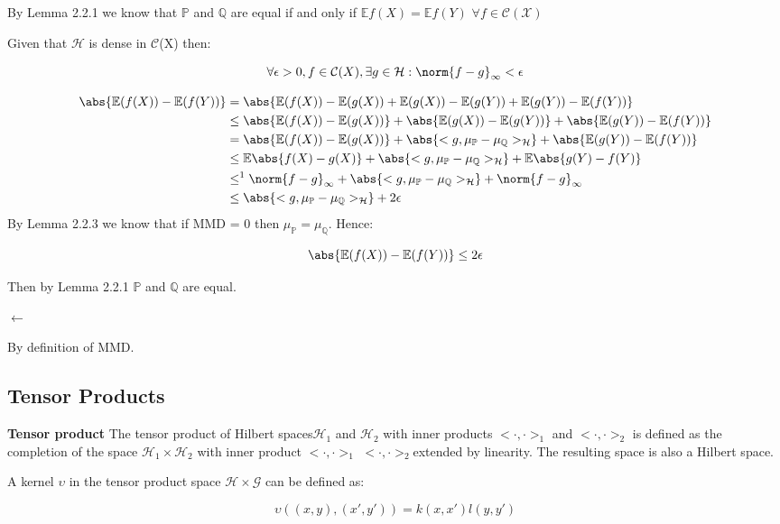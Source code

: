 By Lemma 2.2.1 we know that $\mathbb{P}$ and $\mathbb{Q}$  are equal if and only if $\mathbb{E}f(X) = \mathbb{E}f(Y)$  $\forall f \in \mathcal{C(X)}$

Given that $\mathcal{H}$ is dense in $\mathcal{C}$(X) then:

$$\forall \epsilon >0, f\in\mathcal{C}(X), \exists g\in \mathcal{H} : \norm{f-g}_{\infty} < \epsilon$$

\begin{equation}{}
\begin{split}
\abs{\mathbb{E}(f(X)) - \mathbb{E}(f(Y))}  
& = \abs{\mathbb{E}(f(X)) - \mathbb{E}(g(X)) + \mathbb{E}(g(X)) - \mathbb{E}(g(Y)) +\mathbb{E}(g(Y)) - \mathbb{E}(f(Y))} \\
&\leq \abs{\mathbb{E}(f(X)) - \mathbb{E}(g(X))} + \abs{\mathbb{E}(g(X)) - \mathbb{E}(g(Y))} +\abs{\mathbb{E}(g(Y)) - \mathbb{E}(f(Y))}\\
&= \abs{\mathbb{E}(f(X)) - \mathbb{E}(g(X))} + \abs{<g,\mu_{\mathbb{P}}-\mu_{\mathbb{Q}}>_{\mathcal{H}} } +\abs{\mathbb{E}(g(Y)) - \mathbb{E}(f(Y))} \\
&\leq \mathbb{E}\abs{f(X) - g(X)} + \abs{<g,\mu_{\mathbb{P}}-\mu_{\mathbb{Q}}>_{\mathcal{H}} } +\mathbb{E}\abs{g(Y) - f(Y)} \\ 
&\leq^{1} \norm{f-g}_{\infty}  + \abs{<g,\mu_{\mathbb{P}}-\mu_{\mathbb{Q}}>_{\mathcal{H}} } + \norm{f-g}_{\infty}\\
&\leq \abs{<g,\mu_{\mathbb{P}}-\mu_{\mathbb{Q}}>_{\mathcal{H}} } + 2\epsilon
\end{split}
\end{equation}
By Lemma 2.2.3 we know that if MMD = 0 then $\mu_{\mathbb{P}} = \mu_{\mathbb{Q}}$. Hence:

$$\abs{\mathbb{E}(f(X)) - \mathbb{E}(f(Y))} \leq 2\epsilon$$

Then by Lemma 2.2.1 $\mathbb{P}$ and $\mathbb{Q}$  are equal.

\begin{flushleft}
$\leftarrow$
\end{flushleft}
By definition of MMD.

\newpage
\subsection{Tensor Products\label{P:TP}}
\begin{defn}
\textbf{Tensor product}
The tensor product of Hilbert spaces$\mathcal{H}_{1}$ and $\mathcal{H}_{2}$  with inner products $<·, ·>_{1}$ and
$<·, ·>_{2}$ is defined as the completion of the space $\mathcal{H}_{1}\times\mathcal{H}_{2}$  with inner product  $<·, ·>_{1}$ $<·, ·>_{2}$extended
by linearity. The resulting space is also a Hilbert space.
\end{defn}
\begin{lem}
A kernel $\upsilon$ in the tensor product space  $\mathcal{H}\times\mathcal{G}$ can be defined as:

$$\upsilon((x,y),(x',y')) = k(x,x')l(y,y')$$
\end{lem}

